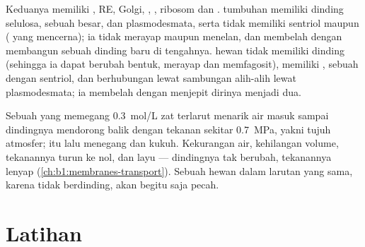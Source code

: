 \begin{proposition}\label{prop:b1:eukaryotic-cell:compare}
Keduanya memiliki , RE, Golgi, , , ribosom dan
.  tumbuhan memiliki dinding selulosa, sebuah 
besar,  dan plasmodesmata, serta tidak memiliki sentriol maupun
 ( yang mencerna); ia tidak merayap maupun menelan, dan
membelah dengan membangun sebuah dinding baru di tengahnya.  hewan
tidak memiliki dinding (sehingga ia dapat berubah bentuk, merayap dan
memfagosit), memiliki , sebuah  dengan sentriol, dan
berhubungan lewat sambungan alih-alih lewat plasmodesmata; ia membelah
dengan menjepit dirinya menjadi dua.
\end{proposition}

\begin{example}[Turgor]\label{ex:b1:eukaryotic-cell:turgor}
Sebuah   yang  memegang \qty{0.3}{mol/L} zat terlarut
menarik air masuk sampai dindingnya mendorong balik dengan tekanan
sekitar \qty{0.7}{MPa}, yakni tujuh atmosfer;  itu lalu menegang dan
 kukuh. Kekurangan air,  kehilangan volume, tekanannya
turun ke nol, dan  layu --- dindingnya tak berubah, tekanannya
lenyap (\cref{ch:b1:membranes-transport}). Sebuah  hewan dalam
larutan yang sama, karena tidak berdinding, akan begitu saja pecah.
\end{example}

\section{Latihan}

